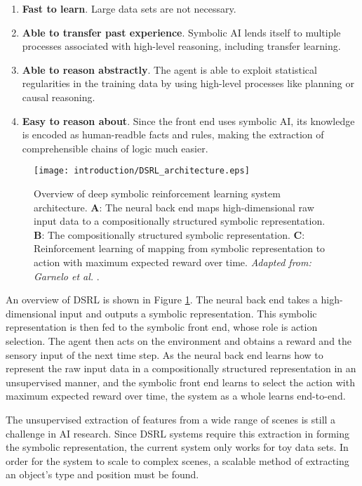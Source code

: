 \begin{enumerate}
\item \textbf{Fast to learn}. Large data sets are not necessary.
\item \textbf{Able to transfer past experience}. Symbolic AI lends itself to multiple processes associated with high-level reasoning, including transfer learning.
\item \textbf{Able to reason abstractly}. The agent is able to exploit statistical regularities in the
training data by using high-level processes like planning or causal reasoning.
\item \textbf{Easy to reason about}. Since the front end uses symbolic AI, its knowledge is encoded as human-readble facts and rules, making the extraction of comprehensible chains of logic much easier.
\end{enumerate}

\begin{figure}[h!]
\centering
\texttt{[image: introduction/DSRL\_architecture.eps]}
\caption{Overview of deep symbolic reinforcement learning system architecture. \textbf{A}: The neural back end maps high-dimensional raw input data to a compositionally structured symbolic representation. \textbf{B}: The compositionally structured symbolic representation. \textbf{C}: Reinforcement learning of mapping from symbolic representation to action with maximum expected reward over time. \textit{Adapted from: Garnelo et al.} \cite{Garnelo2016}.}
\label{fig:dsrl_archiecture}
\end{figure}

An overview of DSRL is shown in Figure \ref{fig:dsrl_archiecture}. The neural back end takes a high-dimensional input and outputs a symbolic representation. This symbolic representation is then fed to the symbolic front end, whose role is action selection. The agent then acts on the environment and obtains a reward and the sensory input of the next time step. As the neural back end learns how to represent the raw input data in a compositionally structured representation in an unsupervised manner, and the symbolic front end learns to select the action with maximum expected reward over time, the system as a whole learns end-to-end.

The unsupervised extraction of features from a wide range of scenes is still a challenge in AI research. Since DSRL systems require this extraction in forming the symbolic representation, the current system only works for toy data sets. In order for the system to scale to complex scenes, a scalable method of extracting an object's type and position must be found.

